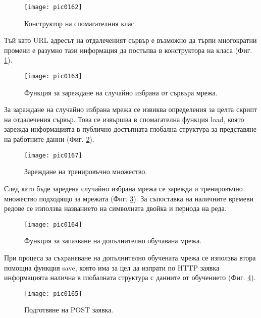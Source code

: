 \begin{figure}[h]
  \centering
  \texttt{[image: pic0162]}
  \caption{Конструктор на спомагателния клас.}
\label{fig:pic0162}
\end{figure}
\FloatBarrier

Тъй като URL адресът на отдалеченият сървър е възможно да търпи многократни промени е разумно тази информация да постъпва в конструктора на класа (Фиг. \ref{fig:pic0162}).

\begin{figure}[h]
  \centering
  \texttt{[image: pic0163]}
  \caption{Функция за зареждане на случайно избрана от сървъра мрежа.}
\label{fig:pic0163}
\end{figure}
\FloatBarrier

За зараждане на случайно избрана мрежа се извиква определения за целта скрипт на отдалечения сървър. Това се извършва в спомагателна функция load, която зарежда информацията в публично достъпната глобална структура за представяне на работните данни (Фиг. \ref{fig:pic0163}). 

\begin{figure}[h]
  \centering
  \texttt{[image: pic0167]}
  \caption{Зареждане на тренировъчно множество.}
\label{fig:pic0167}
\end{figure}
\FloatBarrier

След като бъде заредена случайно избрана мрежа се зарежда и тренировъчно множество подходящо за мрежата (Фиг. \ref{fig:pic0167}). За съпоставка на наличните времеви редове се използва названието на символната двойка и периода на реда. 

\begin{figure}[h]
  \centering
  \texttt{[image: pic0164]}
  \caption{Функция за запазване на допълнително обучавана мрежа.}
\label{fig:pic0164}
\end{figure}
\FloatBarrier

При процеса за съхраняване на допълнително обучената мрежа се използва втора помощна функция save, която има за цел да изпрати по HTTP заявка информацията налична в глобалната структура с данните от обучението (Фиг. \ref{fig:pic0164}). 

\begin{figure}[h]
  \centering
  \texttt{[image: pic0165]}
  \caption{Подготвяне на POST заявка.}
\label{fig:pic0165}
\end{figure}
\FloatBarrier

